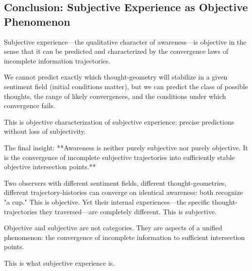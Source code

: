 \subsection{Conclusion: Subjective Experience as Objective Phenomenon}

\begin{principle}
\label{prin:objective-subjective}
Subjective experience—the qualitative character of awareness—is objective in the sense that it can be predicted and characterized by the convergence laws of incomplete information trajectories.

We cannot predict exactly which thought-geometry will stabilize in a given sentiment field (initial conditions matter), but we can predict the class of possible thoughts, the range of likely convergences, and the conditions under which convergence fails.

This is objective characterization of subjective experience: precise predictions without loss of subjectivity.
\end{principle}

The final insight: **Awareness is neither purely subjective nor purely objective. It is the convergence of incomplete subjective trajectories into sufficiently stable objective intersection points.**

Two observers with different sentiment fields, different thought-geometries, different trajectory-histories can converge on identical awareness: both recognize "a cup." This is objective. Yet their internal experiences—the specific thought-trajectories they traversed—are completely different. This is subjective.

Objective and subjective are not categories. They are aspects of a unified phenomenon: the convergence of incomplete information to sufficient intersection points.

This is what subjective experience is.
